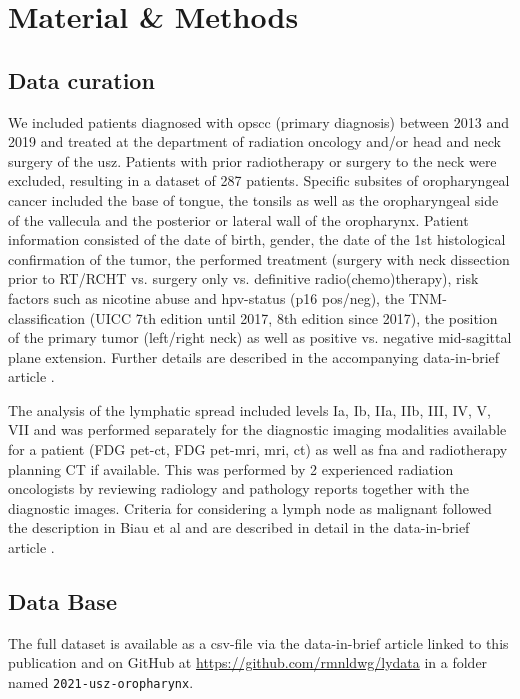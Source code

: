 \documentclass[\relativeRoot/main.tex]{subfiles}
\begin{document}
\section{Material \& Methods}
\label{sec:dataset_usz:material}

\subsection*{Data curation}

We included patients diagnosed with \gls{opscc} (primary diagnosis) between 2013 and 2019 and treated at the department of radiation oncology and/or head and neck surgery of the \gls{usz}. Patients with prior radiotherapy or surgery to the neck were excluded, resulting in a dataset of 287 patients. Specific subsites of oropharyngeal cancer included the base of tongue, the tonsils as well as the oropharyngeal side of the vallecula and the posterior or lateral wall of the oropharynx. Patient information consisted of the date of birth, gender, the date of the 1st histological confirmation of the tumor, the performed treatment (surgery with neck dissection prior to RT/RCHT vs. surgery only vs. definitive radio(chemo)therapy), risk factors such as nicotine abuse and \gls{hpv}-status (p16 pos/neg), the TNM-classification (UICC 7th edition until 2017, 8th edition since 2017), the position of the primary tumor (left/right neck) as well as positive vs. negative mid-sagittal plane extension. Further details are described in the accompanying data-in-brief article \cite{ludwig_dataset_2021}.

The analysis of the lymphatic spread included levels Ia, Ib, IIa, IIb, III, IV, V, VII and was performed separately for the diagnostic imaging modalities available for a patient (FDG \gls{pet}-\gls{ct}, FDG \gls{pet}-\gls{mri}, \gls{mri}, \gls{ct}) as well as \gls{fna} and radiotherapy planning CT if available. This was performed by 2 experienced radiation oncologists by reviewing radiology and pathology reports together with the diagnostic images. Criteria for considering a lymph node as malignant followed the description in Biau et al \cite{biau_selection_2019} and are described in detail in the data-in-brief article \cite{ludwig_dataset_2021}.

\subsection*{Data Base}

The full dataset is available as a \gls{csv}-file via the data-in-brief article linked to this publication \cite{ludwig_dataset_2021} and on GitHub at \url{https://github.com/rmnldwg/lydata} in a folder named \verb|2021-usz-oropharynx|.
\end{document}
